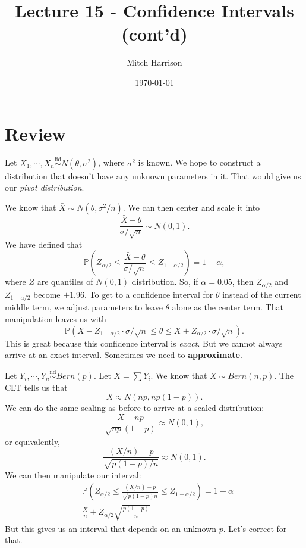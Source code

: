 \documentclass[titlepage, 12pt, leqno]{article}
\title{\Huge{Lecture 15 - Confidence Intervals (cont'd)}}
\author{\large{Mitch Harrison}}
\date{\today}
\begin{document}
\setlength{\parskip}{1\baselineskip}
\setlength{\parindent}{15pt}
\maketitle
\tableofcontents
\newpage


\section{Review}

Let $X_{1}, \cdots , X_{n} \overset{\mathrm{iid}}{\sim} N(\theta,\sigma^{2})$,
where $\sigma^{2}$ is known. We hope to construct a distribution that doesn't
have any unknown parameters in it. That would give us our \textit{pivot
distribution}.

We know that $\bar X \sim N(\theta, \sigma^{2}/n)$. We can then center and
scale it into
\[
\frac{\bar X - \theta}{\sigma/\sqrt{n}} \sim N(0,1).
\]
We have defined that
\[
\mathbb{P}(Z_{\alpha/2} \le \frac{\bar X - \theta}{\sigma/\sqrt{n}} \le
Z_{1-\alpha/2}) = 1 - \alpha,
\]
where $Z$ are quantiles of $N(0,1)$ distribution. So, if $\alpha = 0.05$, then
$Z_{\alpha/2}$ and $Z_{1-\alpha/2}$ become $ \pm 1.96$. To get to a confidence
interval for $\theta$ instead of the current middle term, we adjust parameters
to leave $\theta$ alone as the center term. That manipulation leaves us with
\[
\mathbb{P}(\bar X - Z_{1-\alpha/2}\cdot\sigma/\sqrt{n} \le \theta \le
\bar X + Z_{\alpha/2} \cdot \sigma / \sqrt{n}).
\]
This is great because this confidence interval is \textit{exact}. But we cannot
always arrive at an exact interval. Sometimes we need to \textbf{approximate}.

Let $Y_{i}, \cdots , Y_{n} \overset{\mathrm{iid}}{\sim}Bern(p)$. Let
$X = \sum Y_{i}$. We know that $X \sim Bern(n,p)$. The CLT tells us that
\[
X \approx N(np, np(1-p)).
\]
We can do the same scaling as before to arrive at a scaled distribution:
\[
\frac{X - np}{\sqrt{np}(1-p)} \approx N(0,1),
\]
or equivalently,
\[
\frac{(X/n) -p}{\sqrt{p(1-p)/n}} \approx N(0,1).
\]
We can then manipulate our interval:
\begin{align*}
    &\mathbb{P}(Z_{\alpha/2} \le
    \frac{(X/n) -p}{\sqrt{p(1-p)n}} \le Z_{1 - \alpha/2}) = 1 - \alpha\\
    &\frac{X}{n} \pm Z_{\alpha/2}\sqrt{\frac{p(1-p)}{n}}
\end{align*}
But this gives us an interval that depends on an unknown $p$. Let's correct for
that.
\end{document}
